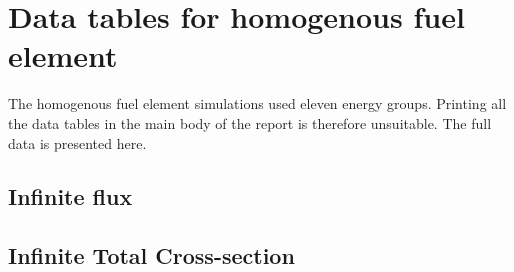 
\chapter{Data tables for homogenous fuel element}
\label{chap:homog_data}

The homogenous fuel element simulations used eleven energy
groups. Printing all the data tables in the main body of the report
is therefore unsuitable. The full data is presented here.

\begin{landscape}
  \section{Infinite flux}
\label{sec:homog_inf_flx_data}

\newpage
\section{Infinite Total Cross-section}
\label{sec:homog_inf_tot_data}


\newpage
\end{landscape}
